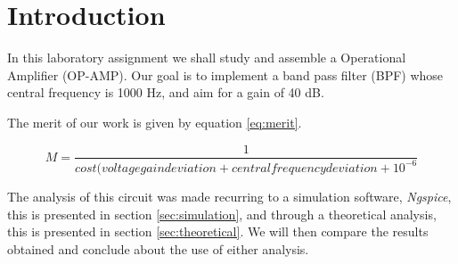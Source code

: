 \section{Introduction}
\label{sec:introduction}

\par In this laboratory assignment we shall study and assemble a Operational Amplifier (OP-AMP). Our goal is to implement a band pass filter (BPF) whose central frequency is 1000 Hz, and aim for a gain of 40 dB.

\par The merit of our work is given by equation \ref{eq:merit}.



\begin{equation}
    M = \frac{1}{cost ( voltagegaindeviation + centralfrequencydeviation + 10^{-6}}
    \label{eq:merit}
\end{equation}




The analysis of this circuit was made recurring to a simulation software, \emph{Ngspice}, this is presented in section \ref{sec:simulation}, and through a theoretical analysis, this is presented in section \ref{sec:theoretical}. We will then compare the results obtained and conclude about the use of either analysis.

